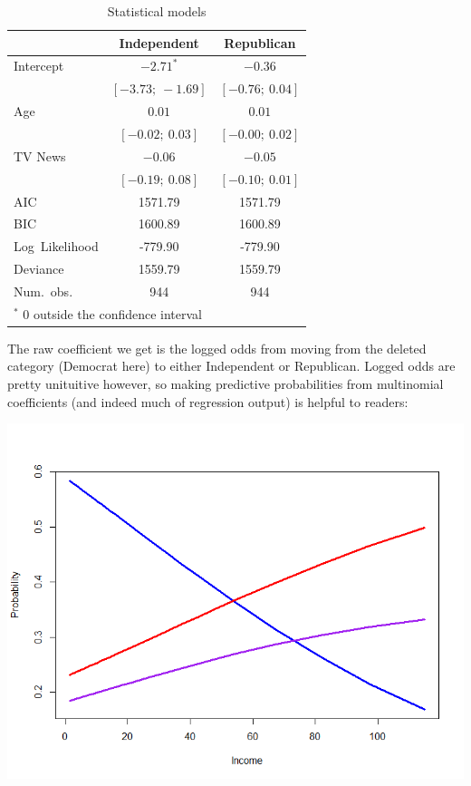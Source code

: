 \documentclass[12pt]{article}\usepackage[]{graphicx}\usepackage[]{color}
\begin{document}
\begin{flushleft}
\begin{table}[h!]
\caption{Statistical models}
\begin{center}
\begin{tabular}{l c c }
\hline
 & Independent & Republican \\
\hline
Intercept       & $\mathbf{-2.71}^{*}$ & $-0.36$          \\
                & $[-3.73;\ -1.69]$    & $[-0.76;\ 0.04]$ \\
Age             & $0.01$               & $0.01$           \\
                & $[-0.02;\ 0.03]$     & $[-0.00;\ 0.02]$ \\
TV News         & $-0.06$              & $-0.05$          \\
                & $[-0.19;\ 0.08]$     & $[-0.10;\ 0.01]$ \\
\hline
AIC             & 1571.79              & 1571.79          \\
BIC             & 1600.89              & 1600.89          \\
Log\ Likelihood & -779.90              & -779.90          \\
Deviance        & 1559.79              & 1559.79          \\
Num.\ obs.      & 944                  & 944              \\
\hline
\multicolumn{3}{l}{\scriptsize{$^*$ 0 outside the confidence interval}}
\end{tabular}
\end{center}
\end{table}

The raw coefficient we get is the logged odds from moving from the deleted category (Democrat here) to either Independent or Republican. Logged odds are pretty unituitive however, so making predictive probabilities from multinomial coefficients (and indeed much of regression output) is helpful to readers:

\begin{center}
\includegraphics[scale=.7]{IncPlot}
\end{center}


\end{flushleft}
\end{document}
